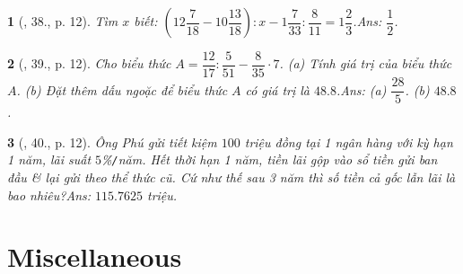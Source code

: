 \documentclass{article}
\newtheorem{baitoan}{}
\begin{document}
\begin{baitoan}[\cite{Tuyen_Toan_7}, 38., p. 12]
	Tìm $x$ biết: $\left(12\dfrac{7}{18} - 10\dfrac{13}{18}\right):x - 1\dfrac{7}{33}:\dfrac{8}{11} = 1\dfrac{2}{3}$.\hfill{\sf Ans: $\dfrac{1}{2}$.}
\end{baitoan}

\begin{baitoan}[\cite{Tuyen_Toan_7}, 39., p. 12]
	Cho biểu thức $A = \dfrac{12}{17}:\dfrac{5}{51} - \dfrac{8}{35}\cdot 7$. (a) Tính giá trị của biểu thức $A$. (b) Đặt thêm dấu ngoặc để biểu thức $A$ có giá trị là $48.8$.\hfill{\sf Ans: (a) $\dfrac{28}{5}$. (b) $48.8$.}
\end{baitoan}

\begin{baitoan}[\cite{Tuyen_Toan_7}, 40., p. 12]
	Ông Phú gửi tiết kiệm $100$ triệu đồng tại 1 ngân hàng với kỳ hạn 1 năm, lãi suất $5$\%\emph{\texttt{/}}năm. Hết thời hạn 1 năm, tiền lãi gộp vào sổ tiền gửi ban đầu \& lại gửi theo thể thức cũ. Cứ như thế sau 3 năm thì số tiền cả gốc lẫn lãi là bao nhiêu?\hfill{\sf Ans: $115.7625$ triệu.}
\end{baitoan}


\section{Miscellaneous}
\end{document}
